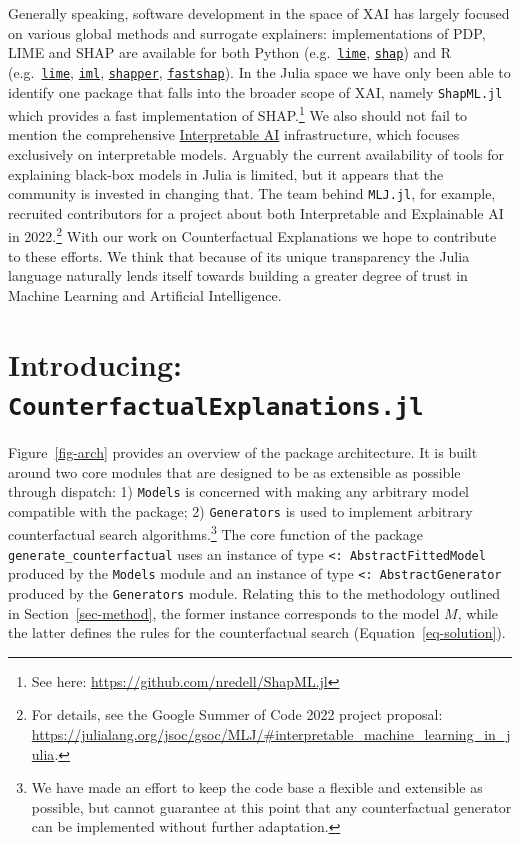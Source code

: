 \documentclass{juliacon}
\begin{document}
Generally speaking, software development in the space of XAI has largely
focused on various global methods and surrogate explainers:
implementations of PDP, LIME and SHAP are available for both Python
(e.g.~\href{https://github.com/marcotcr/lime}{\texttt{lime}},
\href{https://github.com/slundberg/shap}{\texttt{shap}}) and R
(e.g.~\href{https://cran.r-project.org/web/packages/lime/index.html}{\texttt{lime}},
\href{https://cran.r-project.org/web/packages/lime/index.html}{\texttt{iml}},
\href{https://modeloriented.github.io/shapper/}{\texttt{shapper}},
\href{https://github.com/bgreenwell/fastshap}{\texttt{fastshap}}). In
the Julia space we have only been able to identify one package that
falls into the broader scope of XAI, namely \texttt{ShapML.jl} which
provides a fast implementation of SHAP.\footnote{See here:
  \url{https://github.com/nredell/ShapML.jl}} We also should not fail to
mention the comprehensive
\href{https://docs.interpretable.ai/stable/IAIBase/data/}{Interpretable
AI} infrastructure, which focuses exclusively on interpretable models.
Arguably the current availability of tools for explaining black-box
models in Julia is limited, but it appears that the community is
invested in changing that. The team behind \texttt{MLJ.jl}, for example,
recruited contributors for a project about both Interpretable and
Explainable AI in 2022.\footnote{For details, see the Google Summer of
  Code 2022 project proposal:
  \url{https://julialang.org/jsoc/gsoc/MLJ/\#interpretable_machine_learning_in_julia}.}
With our work on Counterfactual Explanations we hope to contribute to
these efforts. We think that because of its unique transparency the
Julia language naturally lends itself towards building a greater degree
of trust in Machine Learning and Artificial Intelligence.

\hypertarget{sec-arch}{%
\section{\texorpdfstring{Introducing:
\texttt{CounterfactualExplanations.jl}}{Introducing: CounterfactualExplanations.jl}}\label{sec-arch}}

Figure~\ref{fig-arch} provides an overview of the package architecture.
It is built around two core modules that are designed to be as
extensible as possible through dispatch: 1) \texttt{Models} is concerned
with making any arbitrary model compatible with the package; 2)
\texttt{Generators} is used to implement arbitrary counterfactual search
algorithms.\footnote{We have made an effort to keep the code base a
  flexible and extensible as possible, but cannot guarantee at this
  point that any counterfactual generator can be implemented without
  further adaptation.} The core function of the package
\texttt{generate\_counterfactual} uses an instance of type
\texttt{\textless{}:\ AbstractFittedModel} produced by the
\texttt{Models} module and an instance of type
\texttt{\textless{}:\ AbstractGenerator} produced by the
\texttt{Generators} module. Relating this to the methodology outlined in
Section~\ref{sec-method}, the former instance corresponds to the model
\(M\), while the latter defines the rules for the counterfactual search
(Equation~\ref{eq-solution}).
\end{document}
